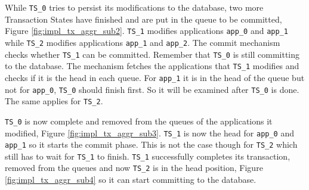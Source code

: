 While \texttt{TS\_0} tries to persist its modifications to the
database, two more Transaction States have finished and are put in the
queue to be committed, Figure
\ref{fig:impl_tx_aggr_sub2}. \texttt{TS\_1} modifies applications
\texttt{app\_0} and \texttt{app\_1} while \texttt{TS\_2} modifies
applications \texttt{app\_1} and \texttt{app\_2}. The commit mechanism
checks whether \texttt{TS\_1} can be committed. Remember that
\texttt{TS\_0} is still committing to the database. The mechanism
fetches the applications that \texttt{TS\_1} modifies and checks if it
is the head in each queue. For \texttt{app\_1} it is in the head of
the queue but not for \texttt{app\_0}, \texttt{TS\_0} should finish
first. So it will be examined after \texttt{TS\_0} is done. The same
applies for \texttt{TS\_2}.

\texttt{TS\_0} is now complete and removed from the queues of the
applications it modified, Figure
\ref{fig:impl_tx_aggr_sub3}. \texttt{TS\_1} is now the head for
\texttt{app\_0} and \texttt{app\_1} so it starts the commit
phase. This is not the case though for \texttt{TS\_2} which still has
to wait for \texttt{TS\_1} to finish. \texttt{TS\_1} successfully
completes its transaction, removed from the queues and now
\texttt{TS\_2} is in the head position, Figure
\ref{fig:impl_tx_aggr_sub4} so it can start committing to the database.

